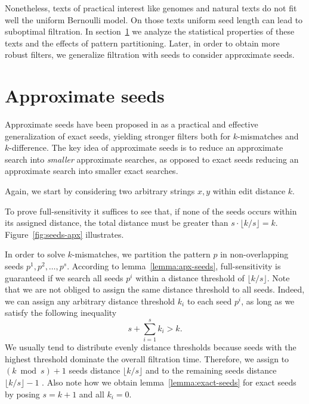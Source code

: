 Nonetheless, texts of practical interest like genomes and natural texts do not fit well the uniform Bernoulli model.
On those texts uniform seed length can lead to suboptimal filtration.
In section~\ref{sec:seeds-apx} we analyze the statistical properties of these texts and the effects of pattern partitioning.
Later, in order to obtain more robust filters, we generalize filtration with seeds to consider approximate seeds.


\section{Approximate seeds}
\label{sec:seeds-apx}

Approximate seeds have been proposed in \citep{Myers1994,Navarro2000} as a practical and effective generalization of exact seeds, yielding stronger filters both for $k$-mismatches and $k$-difference.
The key idea of approximate seeds is to reduce an approximate search into \emph{smaller} approximate searches, as opposed to exact seeds reducing an approximate search into smaller exact searches.

Again, we start by considering two arbitrary strings $x,y$ within edit distance $k$.
To prove full-sensitivity it suffices to see that, if none of the seeds occurs within its assigned distance, the total distance must be greater than $s \cdot \lfloor k/s \rfloor = k$.
Figure~\ref{fig:seeds-apx} illustrates.

In order to solve $k$-mismatches, we partition the pattern $p$ in non-overlapping seeds $p^1, p^2, \dots, p^s$. According to lemma~\ref{lemma:apx-seeds}, full-sensitivity is guaranteed if we search all seeds $p^i$ within a distance threshold of $\lfloor k/s \rfloor$.
Note that we are not obliged to assign the same distance threshold to all seeds.
Indeed, we can assign any arbitrary distance threshold $k_i$ to each seed $p^i$, as long as we satisfy the following inequality
\begin{equation}
s + \sum_{i=1}^{s}{k_i} > k.
\end{equation}
We usually tend to distribute evenly distance thresholds because seeds with the highest threshold dominate the overall filtration time.
Therefore, we assign to $(k \bmod{s}) + 1$ seeds distance $\lfloor k/s \rfloor$ and to the remaining seeds distance $\lfloor k/s \rfloor - 1$ \citep{Siragusa2013}.
Also note how we obtain lemma~\ref{lemma:exact-seeds} for exact seeds by posing $s=k+1$ and all $k_i = 0$.

